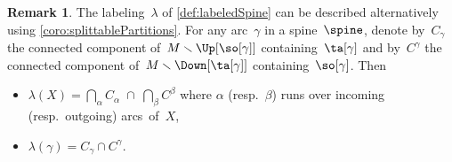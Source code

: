 \documentclass{amsart}
\theoremstyle{definition}
\newtheorem{remark}[theorem]{Remark}
\newcommand{\ssm}{\smallsetminus} %
\newcommand{\labeling}{\lambda} %
\begin{document}
\begin{remark}
  \label{rem:labeledSpine}
  The labeling~$\labeling$ of \cref{def:labeledSpine} can be described alternatively using \cref{coro:splittablePartitions}.
  For any arc~$\gamma$ in a spine~$\spine$, denote by~$C_\gamma$ the connected component of~$M \ssm \Up[{\so[\gamma]}]$ containing~$\ta[\gamma]$ and by~$C^\gamma$ the connected component of~$M \ssm \Down[{\ta[\gamma]}]$ containing~$\so[\gamma]$.
  Then 
  \begin{itemize}
    \item $\labeling(X) = \bigcap_\alpha C_\alpha \; \cap \; \bigcap_\beta C^\beta$ where $\alpha$ (resp.~$\beta$) runs over incoming (resp.~outgoing) arcs~of~$X$,
    \item $\labeling(\gamma) = C_\gamma \cap C^\gamma$.
  \end{itemize}     

\end{remark}
\end{document}
